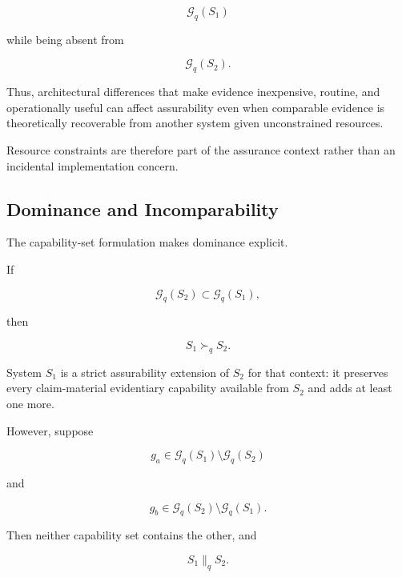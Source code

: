 \begin{equation}
  \mathcal{G}_q(S_1)
\end{equation}

while being absent from

\begin{equation}
  \mathcal{G}_q(S_2).
\end{equation}

Thus, architectural differences that make evidence inexpensive, routine, and
operationally useful can affect assurability even when comparable evidence
is theoretically recoverable from another system given unconstrained resources.

Resource constraints are therefore part of the assurance context rather than an incidental implementation concern.

\subsection{Dominance and Incomparability}
\label{aa.subsec.dominance}

The capability-set formulation makes dominance explicit.

If

\begin{equation}
  \mathcal{G}_q(S_2)
  \subset
  \mathcal{G}_q(S_1),
\end{equation}

then

\begin{equation}
  S_1
  \succ_q
  S_2.
\end{equation}

System \(S_1\) is a strict assurability extension of \(S_2\) for that context:
it preserves every claim-material evidentiary capability available from \(S_2\) and adds at least one more.

However, suppose

\begin{equation}
  g_a
  \in
  \mathcal{G}_q(S_1)
  \setminus
  \mathcal{G}_q(S_2)
\end{equation}

and

\begin{equation}
  g_b
  \in
  \mathcal{G}_q(S_2)
  \setminus
  \mathcal{G}_q(S_1).
\end{equation}

Then neither capability set contains the other, and

\begin{equation}
  S_1
  \parallel_q
  S_2.
\end{equation}

